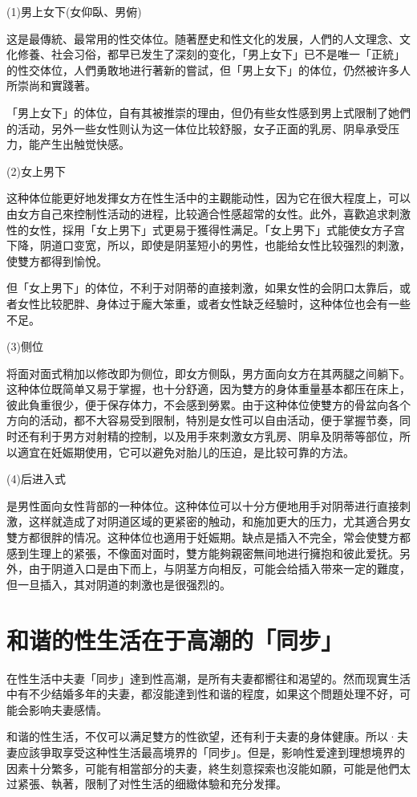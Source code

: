 \documentclass[12pt,UTF8]{ctexbook}
\begin{document}
(1)男上女下(女仰臥、男俯)

这是最傳統、最常用的性交体位。随著歷史和性文化的发展，人們的人文理念、文化修養、社会习俗，都早已发生了深刻的变化，「男上女下」已不是唯一「正統」的性交体位，人們勇敢地进行著新的嘗試，但「男上女下」的体位，仍然被许多人所崇尚和實踐著。

「男上女下」的体位，自有其被推崇的理由，但仍有些女性感到男上式限制了她們的活动，另外一些女性则认为这一体位比较舒服，女子正面的乳房、阴阜承受压力，能产生出触觉快感。

(2)女上男下

这种体位能更好地发揮女方在性生活中的主觀能动性，因为它在很大程度上，可以由女方自己來控制性活动的进程，比较適合性感超常的女性。此外，喜歡追求刺激性的女性，採用「女上男下」式更易于獲得性满足。「女上男下」式能使女方子宫下降，阴道口变宽，所以，即使是阴茎短小的男性，也能给女性比较强烈的刺激，使雙方都得到愉悅。

但「女上男下」的体位，不利于对阴蒂的直接刺激，如果女性的会阴口太靠后，或者女性比较肥胖、身体过于龐大笨重，或者女性缺乏经驗时，这种体位也会有一些不足。

(3)侧位

将面对面式稍加以修改即为侧位，即女方侧臥，男方面向女方在其两腿之间躺下。这种体位既简单又易于掌握，也十分舒適，因为雙方的身体重量基本都压在床上，彼此負重很少，便于保存体力，不会感到勞累。由于这种体位使雙方的骨盆向各个方向的活动，都不大容易受到限制，特別是女性可以自由活动，便于掌握节奏，同时还有利于男方对射精的控制，以及用手來刺激女方乳房、阴阜及阴蒂等部位，所以適宜在妊娠期使用，它可以避免对胎儿的压迫，是比较可靠的方法。

(4)后进入式

是男性面向女性背部的一种体位。这种体位可以十分方便地用手对阴蒂进行直接刺激，这样就造成了对阴道区域的更紧密的触动，和施加更大的压力，尤其適合男女雙方都很胖的情况。这种体位也適用于妊娠期。缺点是插入不完全，常会使雙方都感到生理上的紧張，不像面对面时，雙方能夠親密無间地进行擁抱和彼此爱抚。另外，由于阴道入口是由下而上，与阴茎方向相反，可能会给插入带來一定的難度，但一旦插入，其对阴道的刺激也是很强烈的。

\section{和谐的性生活在于高潮的「同步」}

在性生活中夫妻「同步」達到性高潮，是所有夫妻都嚮往和渴望的。然而现實生活中有不少结婚多年的夫妻，都沒能達到性和谐的程度，如果这个問題处理不好，可能会影响夫妻感情。

和谐的性生活，不仅可以满足雙方的性欲望，还有利于夫妻的身体健康。所以·夫妻应該爭取享受这种性生活最高境界的「同步」。但是，影响性爱達到理想境界的因素十分繁多，可能有相當部分的夫妻，終生刻意探索也沒能如願，可能是他們太过紧張、執著，限制了对性生活的细緻体驗和充分发揮。
\end{document}
